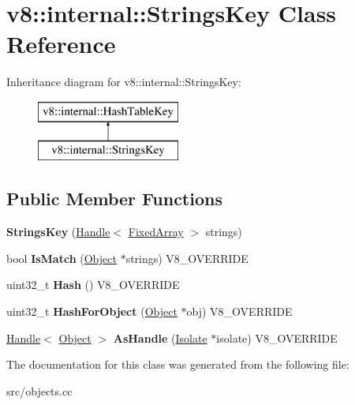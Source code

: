\hypertarget{classv8_1_1internal_1_1_strings_key}{}\section{v8\+:\+:internal\+:\+:Strings\+Key Class Reference}
\label{classv8_1_1internal_1_1_strings_key}
Inheritance diagram for v8\+:\+:internal\+:\+:Strings\+Key\+:\begin{figure}[H]
\begin{center}
\leavevmode
\includegraphics[height=2.000000cm]{classv8_1_1internal_1_1_strings_key}
\end{center}
\end{figure}
\subsection*{Public Member Functions}
\begin{DoxyCompactItemize}
\item 
\hypertarget{classv8_1_1internal_1_1_strings_key_a983c799f46808adff218ee7605005538}{}{\bfseries Strings\+Key} (\hyperlink{classv8_1_1internal_1_1_handle}{Handle}$<$ \hyperlink{classv8_1_1internal_1_1_fixed_array}{Fixed\+Array} $>$ strings)\label{classv8_1_1internal_1_1_strings_key_a983c799f46808adff218ee7605005538}

\item 
\hypertarget{classv8_1_1internal_1_1_strings_key_adcd15ba97949e7024cbbb637c439037a}{}bool {\bfseries Is\+Match} (\hyperlink{classv8_1_1internal_1_1_object}{Object} $\ast$strings) V8\+\_\+\+O\+V\+E\+R\+R\+I\+D\+E\label{classv8_1_1internal_1_1_strings_key_adcd15ba97949e7024cbbb637c439037a}

\item 
\hypertarget{classv8_1_1internal_1_1_strings_key_a11e7b1a4b40f100251385583f15eed55}{}uint32\+\_\+t {\bfseries Hash} () V8\+\_\+\+O\+V\+E\+R\+R\+I\+D\+E\label{classv8_1_1internal_1_1_strings_key_a11e7b1a4b40f100251385583f15eed55}

\item 
\hypertarget{classv8_1_1internal_1_1_strings_key_af3a9fc034d5cfbdb2ab8572b0deec8d5}{}uint32\+\_\+t {\bfseries Hash\+For\+Object} (\hyperlink{classv8_1_1internal_1_1_object}{Object} $\ast$obj) V8\+\_\+\+O\+V\+E\+R\+R\+I\+D\+E\label{classv8_1_1internal_1_1_strings_key_af3a9fc034d5cfbdb2ab8572b0deec8d5}

\item 
\hypertarget{classv8_1_1internal_1_1_strings_key_a17439d5bbc8c75382f472c3c9f1bbaf2}{}\hyperlink{classv8_1_1internal_1_1_handle}{Handle}$<$ \hyperlink{classv8_1_1internal_1_1_object}{Object} $>$ {\bfseries As\+Handle} (\hyperlink{classv8_1_1internal_1_1_isolate}{Isolate} $\ast$isolate) V8\+\_\+\+O\+V\+E\+R\+R\+I\+D\+E\label{classv8_1_1internal_1_1_strings_key_a17439d5bbc8c75382f472c3c9f1bbaf2}

\end{DoxyCompactItemize}


The documentation for this class was generated from the following file\+:\begin{DoxyCompactItemize}
\item 
src/objects.\+cc\end{DoxyCompactItemize}
